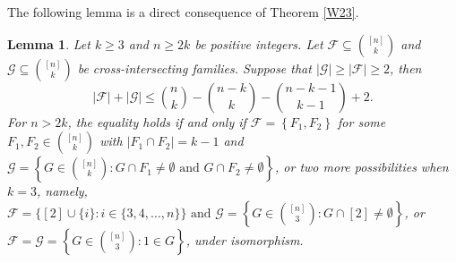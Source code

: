 \documentclass[11pt]{article}
\numberwithin{equation}{section}
\newtheorem{lemma}[theorem]{Lemma}
\begin{document}
The following lemma is a direct consequence of Theorem \ref{W23}. 

\begin{lemma}\label{W231}
Let $k \geq 3$ and $n \geq 2 k$ be positive integers.  Let $\mathcal{F} \subseteq\binom{[n]}{k}$ and $\mathcal{G} \subseteq\binom{[n]}{k}$ be  cross-intersecting families. Suppose that $|\mathcal{G}| \geq|\mathcal{F}| \geq 2$, then
$$
|\mathcal{F}|+|\mathcal{G}| \leq\binom{n}{k}-\binom{n-k}{k}-\binom{n-k-1}{k-1}+2.
$$
For $n > 2 k$,  the equality holds if and only if $\mathcal{F}=\left\{F_1, F_2\right\}$ for some $F_1, F_2 \in\binom{[n]}{k}$ with $\left|F_1 \cap F_2\right|=k-1$ and $\mathcal{G}=\left\{G \in\binom{[n]}{k}: G \cap F_1 \neq \emptyset \text{ and } G \cap F_2 \neq \emptyset\right\}$, or two more possibilities when $k=3$, namely, $\mathcal{F}=\{[2] \cup\{i\}: i \in\{3, 4, \ldots, n\}\}\text{ and } \mathcal{G}=\left\{G \in\binom{[n]}{3}: G \cap[2] \neq \emptyset\right\}$, or $\mathcal{F}=\mathcal{G}=\left\{G \in\binom{[n]}{3}: 1\in G \right\}$, under isomorphism.
\end{lemma}
\end{document}
